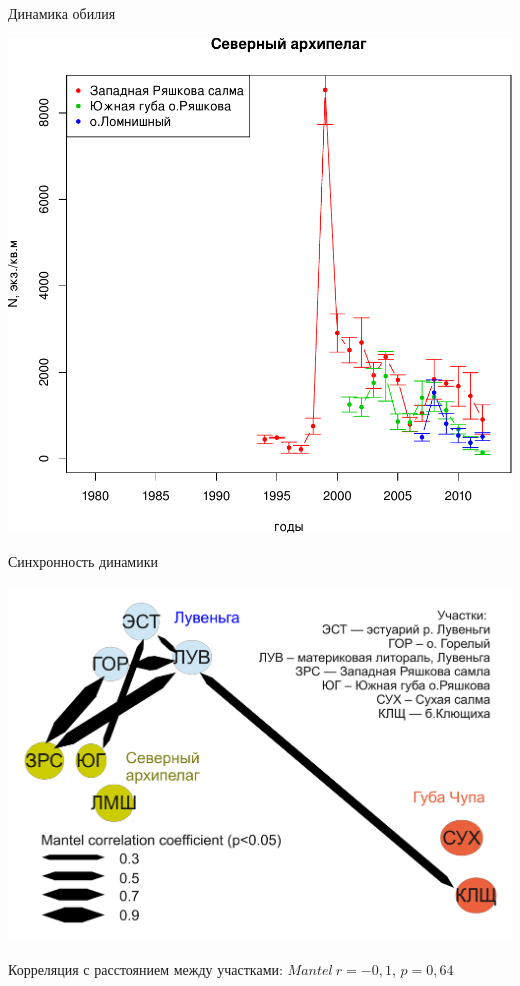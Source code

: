 \documentclass{beamer}
\begin{document}
\begin{frame}{Динамика обилия}
\begin{minipage}[t]{.45\linewidth}
\begin{center}
\end{center}
	\end{minipage}
	\begin{minipage}[t]{.45\linewidth}
			\includegraphics[height=.45\textheight]{N2_dynamic_North_all.pdf}
	\end{minipage}
\end{frame}

\begin{frame}{Синхронность динамики}
 \begin{center}
		\includegraphics[width=.8\textwidth]{Mantel_shema.pdf}
 \end{center}
Корреляция с расстоянием между участками: $Mantel\ r = - 0,1$, $p = 0,64$
\end{frame}
\end{document}
